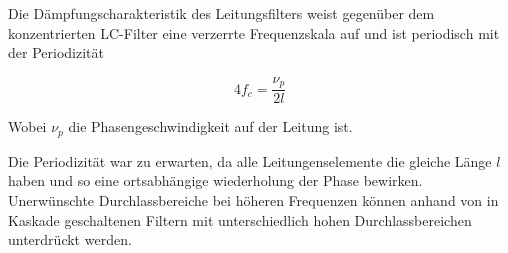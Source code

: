 Die  D\"ampfungscharakteristik  des   Leitungsfilters  weist  gegen\"uber  dem
konzentrierten  LC-Filter eine verzerrte Frequenzskala auf und ist  periodisch
mit der Periodizit\"at

\begin{equation}
    4f_c = \frac{\nu_p}{2l}
\end{equation}

Wobei $\nu_p$ die Phasengeschwindigkeit auf der Leitung ist.

Die Periodizit\"at war  zu  erwarten,  da  alle Leitungenselemente die gleiche
L\"ange $l$ haben und so eine ortsabh\"angige wiederholung der Phase bewirken.
Unerw\"unschte Durchlassbereiche bei  h\"oheren Frequenzen k\"onnen anhand von
in Kaskade geschaltenen Filtern mit unterschiedlich  hohen  Durchlassbereichen
unterdr\"uckt werden.

